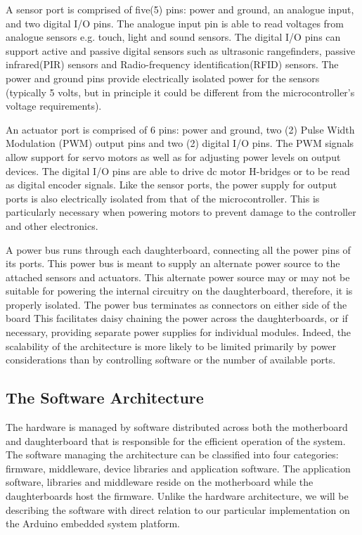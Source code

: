  A sensor port is comprised of five(5) pins: power and ground, an analogue input, and two digital I/O pins. The analogue input pin is able to read voltages from analogue sensors e.g. touch, light and sound sensors. The digital I/O pins can support active and passive digital sensors such as ultrasonic rangefinders,  passive infrared(PIR) sensors and Radio-frequency identification(RFID) sensors. The power and ground pins provide electrically isolated power for the sensors (typically 5 volts, but in principle it could be different from the microcontroller's voltage requirements).

An actuator port is comprised of 6 pins: power and ground, two (2) Pulse Width Modulation (PWM) output pins and two (2) digital I/O pins. The PWM signals allow support for servo motors as well as for adjusting power levels on output devices. The digital I/O pins are able to drive dc motor H-bridges or to be read as digital encoder signals. Like the sensor ports, the power supply for output ports is also electrically isolated from that of the microcontroller. This is particularly necessary when powering motors to prevent damage to the controller and other electronics.

A power bus runs through each daughterboard, connecting all the power pins of its ports. This power bus is meant to supply an alternate power source to the attached sensors and actuators. This alternate power source may or may not be suitable for powering the internal circuitry on the daughterboard, therefore, it is properly isolated.  The power bus terminates as connectors on either side of the board This facilitates daisy chaining the power across the daughterboards, or if necessary, providing separate power supplies for individual modules. Indeed, the scalability of the \xten architecture is more likely to be limited primarily by power considerations than by controlling software or the number of available ports.
\newpage

\subsection{The Software Architecture} %
\label{sub:the_software_architecture}
The \xten hardware is managed by software distributed across both the motherboard and daughterboard that is responsible for the efficient operation of the system. The software managing the architecture can be classified into four categories: firmware, middleware, device libraries and application software. The application software, libraries and middleware reside on the motherboard while the daughterboards host the firmware. Unlike the hardware architecture, we will be describing the software with direct relation to our particular implementation on the Arduino embedded system platform.
	

